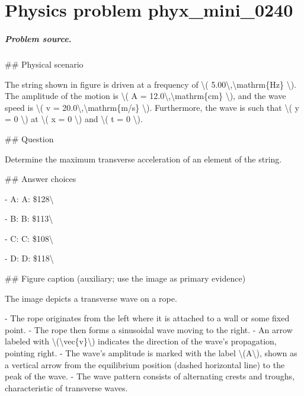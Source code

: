 
\chapter{Physics problem phyx\_mini\_0240}
\label{ch:PhyXMiniProblems_problem_phyx_mini_0240}

\paragraph{Problem source.}
\#\# Physical scenario

The string shown in figure is driven at a frequency of \textbackslash{}( 5.00\textbackslash{},\textbackslash{}mathrm\{Hz\} \textbackslash{}). The amplitude of the motion is \textbackslash{}( A = 12.0\textbackslash{},\textbackslash{}mathrm\{cm\} \textbackslash{}), and the wave speed is \textbackslash{}( v = 20.0\textbackslash{},\textbackslash{}mathrm\{m/s\} \textbackslash{}). Furthermore, the wave is such that \textbackslash{}( y = 0 \textbackslash{}) at \textbackslash{}( x = 0 \textbackslash{}) and \textbackslash{}( t = 0 \textbackslash{}).

\#\# Question

Determine the maximum transverse acceleration of an element of the string.

\#\# Answer choices

- A: A: \$128\textbackslash{}

- B: B: \$113\textbackslash{}

- C: C: \$108\textbackslash{}

- D: D: \$118\textbackslash{}

\#\# Figure caption (auxiliary; use the image as primary evidence)

The image depicts a transverse wave on a rope. 

- The rope originates from the left where it is attached to a wall or some fixed point.
- The rope then forms a sinusoidal wave moving to the right.
- An arrow labeled with \textbackslash{}(\textbackslash{}vec\{v\}\textbackslash{}) indicates the direction of the wave's propagation, pointing right.
- The wave's amplitude is marked with the label \textbackslash{}(A\textbackslash{}), shown as a vertical arrow from the equilibrium position (dashed horizontal line) to the peak of the wave.
- The wave pattern consists of alternating crests and troughs, characteristic of transverse waves.

